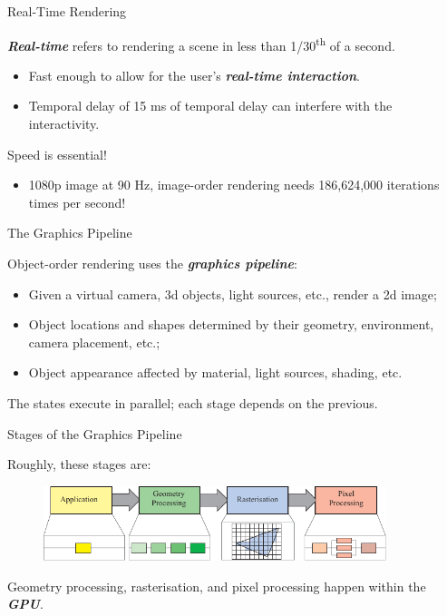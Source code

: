 \documentclass{beamer}
\newcommand{\emphbf}[1]{\textbf{\emph{#1}}}
\begin{document}
\begin{frame}{Real-Time Rendering}

	\emphbf{Real-time} refers to rendering a scene in less than 1/30\textsuperscript{th} of a second.

	\begin{itemize}
		\item Fast enough to allow for the user's \emphbf{real-time interaction}.
		\item Temporal delay of 15 ms of temporal delay can interfere with the interactivity.
	\end{itemize}

	\vskip 1cm

	Speed is essential!

	\begin{itemize}
		\item 1080p image at 90 Hz, image-order rendering needs 186,624,000 iterations times per second!
	\end{itemize}

\end{frame}

\begin{frame}{The Graphics Pipeline}

	Object-order rendering uses the \emphbf{graphics pipeline}:

	\begin{itemize}
		\item Given a virtual camera, 3d objects, light sources, etc., render a 2d image;
		\item Object locations and shapes determined by their geometry, environment,  camera placement, etc.;
		\item Object appearance affected by material, light sources, shading, etc.
	\end{itemize}

	\vskip 1cm

	The states execute in parallel; each stage depends on the previous.

\end{frame}

\begin{frame}{Stages of the Graphics Pipeline}

	Roughly, these stages are:

	\vskip 1cm

	\begin{figure}[t]
		\includegraphics[width=10cm]{main-pipeline}
		\centering
	\end{figure}

	\vskip 1cm

	Geometry processing, rasterisation, and pixel processing happen within the \emphbf{GPU}.

\end{frame}
\end{document}

